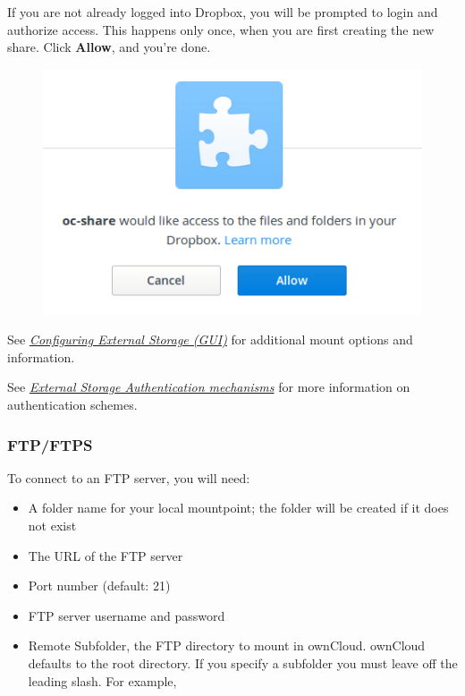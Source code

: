 \documentclass[letterpaper,10pt,english]{sphinxmanual}
\begin{document}
If you are not already logged into Dropbox, you will be prompted to login
and authorize access. This happens only once, when you are first creating
the new share. Click \textbf{Allow}, and you're done.
\begin{figure}[htbp]
\centering

\includegraphics{dropbox-5.png}
\end{figure}

See {\hyperref[configuration_files/external_storage_configuration_gui::doc]{\emph{Configuring External Storage (GUI)}}} for additional mount
options and information.

See {\hyperref[configuration_files/external_storage/auth_mechanisms::doc]{\emph{External Storage Authentication mechanisms}}} for more information on authentication schemes.


\subsubsection{FTP/FTPS}
\label{configuration_files/external_storage/ftp:ftp-ftps}\label{configuration_files/external_storage/ftp::doc}
To connect to an FTP server, you will need:
\begin{itemize}
\item {} 
A folder name for your local mountpoint; the folder will be created if it
does not exist

\item {} 
The URL of the FTP server

\item {} 
Port number (default: 21)

\item {} 
FTP server username and password

\item {} 
Remote Subfolder, the FTP directory to mount in ownCloud. ownCloud defaults
to the root directory. If you specify a subfolder you must leave
off the leading slash. For example, 

\end{itemize}
\end{document}
